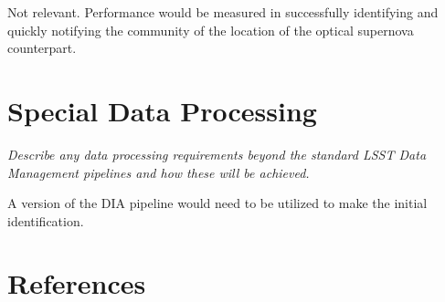 \documentclass[11pt]{article}
\begin{document}
Not relevant.  Performance would be measured in successfully
identifying and quickly notifying the community of the location of the
optical supernova counterpart.


\vspace{.6in}

\section{Special Data Processing}
\begin{footnotesize}
{\it Describe any data processing requirements beyond the standard LSST Data Management pipelines and how these will be achieved.}
\end{footnotesize}

A version of the DIA pipeline would need to be utilized to make the
initial identification.

\section{References}

 

\end{document}
